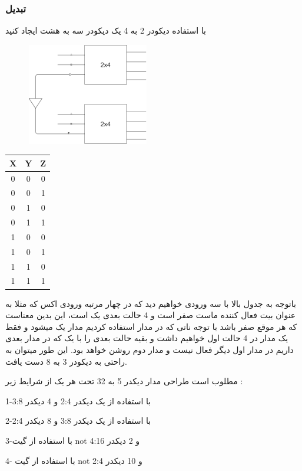 \documentclass[20pt, a4paper]{article}
\begin{document}
\subsubsection{تبدیل}
با استفاده دیکودر 2 به 4 یک دیکودر سه به هشت ایجاد کنید

\begin{figure}[htbp]\centering
	\centerline{\includegraphics[width=150pt]{img/lastest/2to4convert3to8.png}}
\end{figure}

\begin{LTR}
	\begin{tabular}{ c c c }
		X & Y & Z\\
		\hline
		0  & 0 & 0\\ 				
		0 & 0 & 1\\
		0 & 1 & 0\\
		0 & 1 & 1\\
		1 & 0 & 0\\
		1 & 0 & 1\\
		1 & 1 & 0\\
		1 & 1 & 1\\	
	\end{tabular}
\end{LTR}
\hfill \break

باتوجه به جدول بالا با سه ورودی خواهیم دید که در چهار مرتبه ورودی
اکس که مثلا به عنوان بیت فعال کننده ماست صفر است و 4 حالت بعدی 
یک است، این بدین معناست که هر موقع صفر باشد با توجه ناتی که در مدار استفاده کردیم
مدار یک میشود و فقط یک مدار در 4 حالت اول خواهیم داشت و بقیه حالت بعدی را با یک 
که در مدار بعدی داریم در مدار اول دیگر فعال نیست و مدار دوم روشن خواهد بود. این
طور میتوان به راحتی به دیکودر 3 به 8 دست یافت.
\newpage

مطلوب است طراحی مدار دیکدر 5 به 32 تحت هر یک از شرایط زیر :

1-با استفاده از یک دیکدر 2:4 و 4 دیکدر 3:8

2-با استفاده از یک دیکدر 3:8 و 8 دیکدر 2:4

3-با استفاده از گیت not و 2 دیکدر 4:16

4- با استفاده از گیت not و 10 دیکدر 2:4
\end{document}
